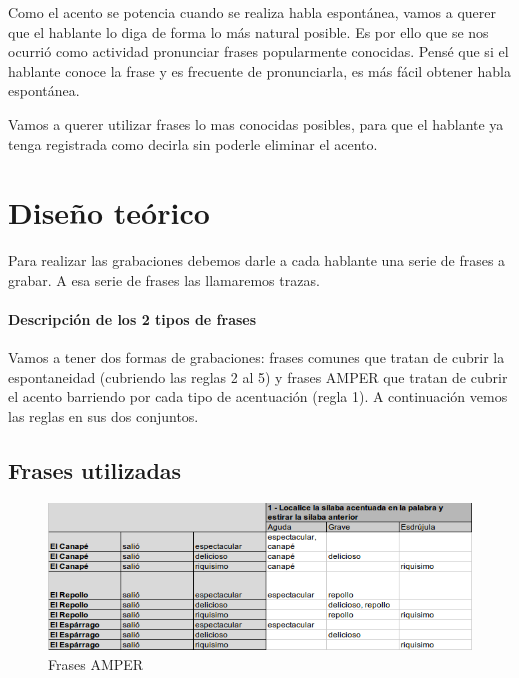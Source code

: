 \documentclass[11pt,a4paper,twoside]{tesis}
\begin{document}
Como el acento se potencia cuando se realiza habla espontánea, vamos a querer que el hablante lo diga de forma lo más natural posible. Es por ello que se nos ocurrió como actividad pronunciar frases popularmente conocidas. Pensé que si el hablante conoce la frase y es frecuente de pronunciarla, es más fácil obtener habla espontánea.

Vamos a querer utilizar frases lo mas conocidas posibles, para que el hablante ya tenga registrada como decirla sin poderle eliminar el acento.

\section{Diseño teórico}

Para realizar las grabaciones debemos darle a cada hablante una serie de frases a grabar. A esa serie de frases las llamaremos trazas.

\paragraph{Descripción de los 2 tipos de frases}

Vamos a tener dos formas de grabaciones: frases comunes que tratan de cubrir la espontaneidad (cubriendo las reglas 2 al 5) y frases AMPER que tratan de cubrir el acento barriendo por cada tipo de acentuación (regla 1). A continuación vemos las reglas en sus dos conjuntos.

\subsection{Frases utilizadas}

\begin{figure}[h!]
    \centerline{\includegraphics[width=1\textwidth]{reglas_AMPER} }
    \caption{Frases AMPER}
    \label{fig21}
\end{figure}
\end{document}
